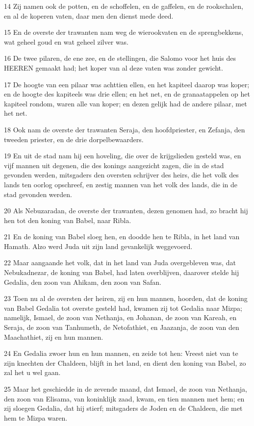 \par 14 Zij namen ook de potten, en de schoffelen, en de gaffelen, en de rookschalen, en al de koperen vaten, daar men den dienst mede deed.
\par 15 En de overste der trawanten nam weg de wierookvaten en de sprengbekkens, wat geheel goud en wat geheel zilver was.
\par 16 De twee pilaren, de ene zee, en de stellingen, die Salomo voor het huis des HEEREN gemaakt had; het koper van al deze vaten was zonder gewicht.
\par 17 De hoogte van een pilaar was achttien ellen, en het kapiteel daarop was koper; en de hoogte des kapiteels was drie ellen; en het net, en de granaatappelen op het kapiteel rondom, waren alle van koper; en dezen gelijk had de andere pilaar, met het net.
\par 18 Ook nam de overste der trawanten Seraja, den hoofdpriester, en Zefanja, den tweeden priester, en de drie dorpelbewaarders.
\par 19 En uit de stad nam hij een hoveling, die over de krijgslieden gesteld was, en vijf mannen uit degenen, die des konings aangezicht zagen, die in de stad gevonden werden, mitsgaders den oversten schrijver des heirs, die het volk des lands ten oorlog opschreef, en zestig mannen van het volk des lands, die in de stad gevonden werden.
\par 20 Als Nebuzaradan, de overste der trawanten, dezen genomen had, zo bracht hij hen tot den koning van Babel, naar Ribla.
\par 21 En de koning van Babel sloeg hen, en doodde hen te Ribla, in het land van Hamath. Alzo werd Juda uit zijn land gevankelijk weggevoerd.
\par 22 Maar aangaande het volk, dat in het land van Juda overgebleven was, dat Nebukadnezar, de koning van Babel, had laten overblijven, daarover stelde hij Gedalia, den zoon van Ahikam, den zoon van Safan.
\par 23 Toen nu al de oversten der heiren, zij en hun mannen, hoorden, dat de koning van Babel Gedalia tot overste gesteld had, kwamen zij tot Gedalia naar Mizpa; namelijk, Ismael, de zoon van Nethanja, en Johanan, de zoon van Kareah, en Seraja, de zoon van Tanhumeth, de Netofathiet, en Jaazanja, de zoon van den Maachathiet, zij en hun mannen.
\par 24 En Gedalia zwoer hun en hun mannen, en zeide tot hen: Vreest niet van te zijn knechten der Chaldeen, blijft in het land, en dient den koning van Babel, zo zal het u wel gaan.
\par 25 Maar het geschiedde in de zevende maand, dat Ismael, de zoon van Nethanja, den zoon van Elisama, van koninklijk zaad, kwam, en tien mannen met hem; en zij sloegen Gedalia, dat hij stierf; mitsgaders de Joden en de Chaldeen, die met hem te Mizpa waren.
